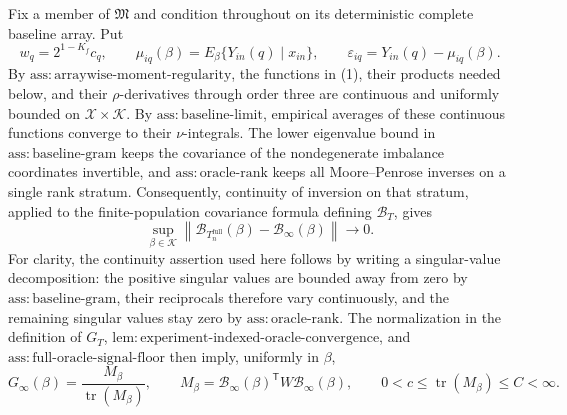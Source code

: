 Fix a member of \(\mathfrak M\) and condition throughout on its deterministic complete baseline array.  Put
\[
w_q=2^{1-K_f}c_q,
\qquad
\mu_{iq}(\beta)=E_\beta\{Y_{in}(q)\mid x_{in}\},
\qquad
\varepsilon_{iq}=Y_{in}(q)-\mu_{iq}(\beta).
\tag{1}
\]
By \(\mathrm{ass{:}arraywise\text{-}moment\text{-}regularity}\), the functions in (1), their products needed below, and their \(\rho\)-derivatives through order three are continuous and uniformly bounded on \(\mathcal X\times\mathcal K\).  By \(\mathrm{ass{:}baseline\text{-}limit}\), empirical averages of these continuous functions converge to their \(\nu\)-integrals.  The lower eigenvalue bound in \(\mathrm{ass{:}baseline\text{-}gram}\) keeps the covariance of the nondegenerate imbalance coordinates invertible, and \(\mathrm{ass{:}oracle\text{-}rank}\) keeps all Moore--Penrose inverses on a single rank stratum.  Consequently, continuity of inversion on that stratum, applied to the finite-population covariance formula defining \(\mathcal B_T\), gives
\[
\sup_{\beta\in\mathcal K}
\left\|\mathcal B_{T_n^{\mathrm{full}}}(\beta)
-\mathcal B_\infty(\beta)\right\|\longrightarrow0.
\tag{2}
\]
For clarity, the continuity assertion used here follows by writing a singular-value decomposition: the positive singular values are bounded away from zero by \(\mathrm{ass{:}baseline\text{-}gram}\), their reciprocals therefore vary continuously, and the remaining singular values stay zero by \(\mathrm{ass{:}oracle\text{-}rank}\).  The normalization in the definition of \(G_T\), \(\mathrm{lem{:}experiment\text{-}indexed\text{-}oracle\text{-}convergence}\), and \(\mathrm{ass{:}full\text{-}oracle\text{-}signal\text{-}floor}\) then imply, uniformly in \(\beta\),
\[
G_\infty(\beta)=\frac{M_\beta}{\operatorname{tr}(M_\beta)},
\qquad
M_\beta=\mathcal B_\infty(\beta)^{\mathsf T}
W\mathcal B_\infty(\beta),
\qquad
0<c\leq\operatorname{tr}(M_\beta)\leq C<\infty.
\tag{3}
\]

